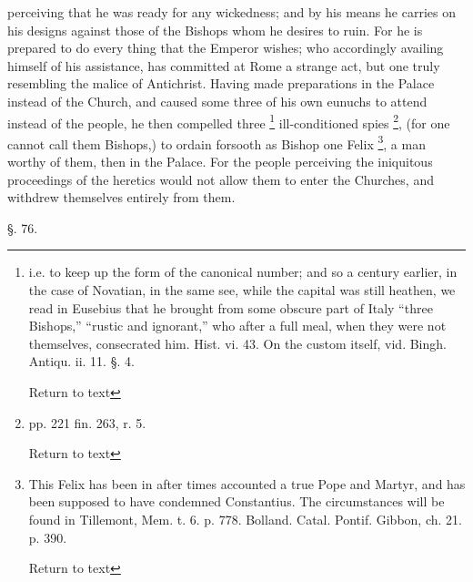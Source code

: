 perceiving that he was ready for any wickedness; and by his means he
carries on his designs against those of the Bishops whom he desires to
ruin. For he is prepared to do every thing that the Emperor wishes;
who accordingly availing himself of his assistance, has committed at
Rome a strange act, but one truly resembling the malice of Antichrist.
Having made preparations in the Palace instead of the Church, and
caused some three of his own eunuchs to attend instead of the people,
he then compelled three \footnote{i.e. to keep up the form of the canonical
number; and so a century earlier, in the case of Novatian, in the same
see, while the capital was still heathen, we read in Eusebius that he
brought from some obscure part of Italy ``three Bishops,'' ``rustic and
ignorant,'' who after a full meal, when they were not themselves,
consecrated him. Hist. vi. 43. On the custom itself, vid. Bingh.
Antiqu. ii. 11. §. 4.

Return to text} ill-conditioned spies
\footnote{pp. 221 fin. 263, r. 5.

Return to text}, (for
one cannot call them Bishops,) to ordain forsooth as Bishop one Felix
\footnote{This Felix has been in after times accounted a
true Pope and Martyr, and has been supposed to have condemned
Constantius. The circumstances will be found in Tillemont, Mem. t. 6.
p. 778. Bolland. Catal. Pontif. Gibbon, ch. 21. p. 390.

Return to text}, a man worthy of them, then in the Palace. For the people
perceiving the iniquitous proceedings of the heretics would not allow
them to enter the Churches, and withdrew themselves entirely from
them.

§. 76.


